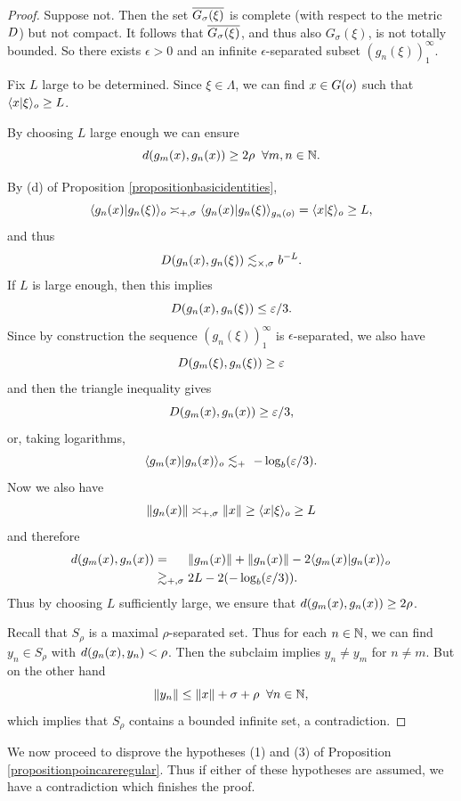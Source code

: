 \begin{proof}
Suppose not. Then the set $\overline{G_\sigma(\xi)}$ is complete (with respect to the metric $D$) but not compact. It follows that $\overline{G_\sigma(\xi)}$, and thus also $G_\sigma(\xi)$, is not totally bounded. So there exists $\epsilon > 0$ and an infinite $\epsilon$-separated subset $(g_n(\xi))_1^\infty$.

Fix $L$ large to be determined. Since $\xi\in\Lambda$, we can find $x\in G(o)$ such that $\langle x | \xi \rangle_o \geq L$.

\begin{subclaim}
By choosing $L$ large enough we can ensure
\[
\dist(g_m(x),g_n(x)) \geq 2\rho \all m,n\in\N.
\]
\end{subclaim}
\begin{subproof}
By (d) of Proposition \ref{propositionbasicidentities},
\[
\langle g_n(x) | g_n(\xi) \rangle_o \asymp_{+,\sigma} \langle g_n(x) | g_n(\xi) \rangle_{g_n(o)} = \langle x|\xi\rangle_o \geq L ,
\]
and thus 
\[
D(g_n(x),g_n(\xi)) \lesssim_{\times,\sigma} b^{-L} .
\]
If $L$ is large enough, then this implies
\[
D(g_n(x),g_n(\xi)) \leq \varepsilon/3.
\]
Since by construction the sequence $(g_n(\xi))_1^\infty$ is $\epsilon$-separated, we also have
\[
D(g_m(\xi),g_n(\xi)) \geq \varepsilon
\]
and then the triangle inequality gives
\[
D(g_m(x),g_n(x)) \geq \varepsilon/3,
\]
or, taking logarithms,
\[
\langle g_m(x) | g_n(x) \rangle_o \lesssim_+ \ -\log_b(\varepsilon/3).
\]
Now we also have
\[
\|g_n(x)\| \asymp_{+,\sigma} \|x\| \geq \langle x|\xi\rangle_o \geq L
\]
and therefore
\begin{align*}
\dist(g_m(x),g_n(x))
&=_{\phantom{\plus,\sigma}} \dox{g_m(x)} + \dox{g_n(x)} - 2\lb g_m(x)|g_n(x)\rb_\zero\\
&\gtrsim_{\plus,\sigma} 2L - 2(- \log_b (\epsilon/3)).
\end{align*}
Thus by choosing $L$ sufficiently large, we ensure that $d(g_m(x),g_n(x)) \geq 2\rho$.

\end{subproof}
Recall that $S_\rho$ is a maximal $\rho$-separated set. Thus for each $n\in\N$, we can find $y_n\in S_\rho$ with $d(g_n(x),y_n) < \rho$. Then the subclaim implies $y_n\neq y_m$ for $n\neq m$. But on the other hand
\[
\dox{y_n} \leq \dox x + \sigma + \rho \all n\in\N,
\]
which implies that $S_\rho$ contains a bounded infinite set, a contradiction.
\end{proof}

We now proceed to disprove the hypotheses (1) and (3) of Proposition \ref{propositionpoincareregular}. Thus if either of these hypotheses are assumed, we have a contradiction which finishes the proof.

